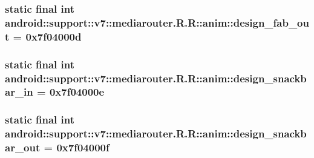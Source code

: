 \hypertarget{classandroid_1_1support_1_1v7_1_1mediarouter_1_1_r_1_1anim_fd2cede7a1d6d8a669267ba4fff823c8}{
\subsubsection[{design\_\-fab\_\-out}]{\setlength{\rightskip}{0pt plus 5cm}static final int android::support::v7::mediarouter.R.R::anim::design\_\-fab\_\-out = 0x7f04000d}}
\label{classandroid_1_1support_1_1v7_1_1mediarouter_1_1_r_1_1anim_fd2cede7a1d6d8a669267ba4fff823c8}


\hypertarget{classandroid_1_1support_1_1v7_1_1mediarouter_1_1_r_1_1anim_8c16bb7f0ff5765ea9d4b00072f94661}{
\subsubsection[{design\_\-snackbar\_\-in}]{\setlength{\rightskip}{0pt plus 5cm}static final int android::support::v7::mediarouter.R.R::anim::design\_\-snackbar\_\-in = 0x7f04000e}}
\label{classandroid_1_1support_1_1v7_1_1mediarouter_1_1_r_1_1anim_8c16bb7f0ff5765ea9d4b00072f94661}


\hypertarget{classandroid_1_1support_1_1v7_1_1mediarouter_1_1_r_1_1anim_3f46122771e0bb8970589c457197af3c}{
\subsubsection[{design\_\-snackbar\_\-out}]{\setlength{\rightskip}{0pt plus 5cm}static final int android::support::v7::mediarouter.R.R::anim::design\_\-snackbar\_\-out = 0x7f04000f}}
\label{classandroid_1_1support_1_1v7_1_1mediarouter_1_1_r_1_1anim_3f46122771e0bb8970589c457197af3c}




